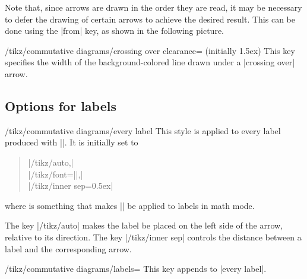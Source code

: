 \documentclass[a4paper]{ltxdoc}
\begin{document}
Note that, since arrows are drawn in the order they are read, it may
be necessary to defer the drawing of certain arrows to achieve the
desired result.  This can be done using the |from| key, as shown in the
following picture.

\begin{codeexample}[]
\end{codeexample}
  
\begin{key}{/tikz/commutative diagrams/crossing over clearance=
    (initially 1.5ex)}
  This key specifies the width of the background-colored line drawn
  under a |crossing over| arrow.
\end{key}

\subsection{Options for labels}
\label{sec:options-labels}

\begin{stylekey}{/tikz/commutative diagrams/every label}
  This style is applied to every label produced with |\arrow|.  It is initially set
  to

\begin{verse}
|/tikz/auto,|\\
|/tikz/font=||,|\\
|/tikz/inner sep=0.5ex|
\end{verse}
where  is something that makes |\scriptstyle| be
applied to labels in math mode.
\end{stylekey}

The key |/tikz/auto| makes the label be placed on the left side of the
arrow, relative to its direction.  The key |/tikz/inner sep| controls
the distance between a label and the corresponding arrow.

\begin{key}{/tikz/commutative diagrams/labels=}
  This key appends  to |every label|.
\end{key}
\end{document}
